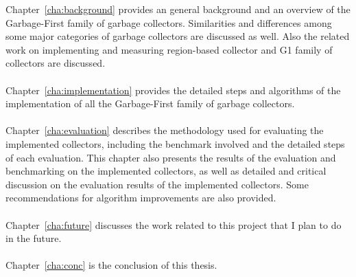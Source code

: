 Chapter~\ref{cha:background}
provides an general background and an overview of the Garbage-First family of garbage collectors.
Similarities and differences among some major categories of garbage collectors are discussed as well.
Also the related work on implementing and measuring region-based collector and G1 family
of collectors are discussed.
\\\\
Chapter~\ref{cha:implementation} provides the detailed steps and algorithms of the implementation of
all the Garbage-First family of garbage collectors.
\\\\
Chapter~\ref{cha:evaluation}
describes the methodology used for evaluating the implemented collectors,
including the benchmark involved and the detailed steps of each evaluation.
This chapter also presents the results of the evaluation and benchmarking on the implemented collectors,
as well as detailed and critical discussion on the evaluation results of the
implemented collectors. Some recommendations for algorithm improvements are also provided.
\\\\
Chapter~\ref{cha:future} discusses the work related to this project that I plan to do in the future.
\\\\
Chapter~\ref{cha:conc} is the conclusion of this thesis.